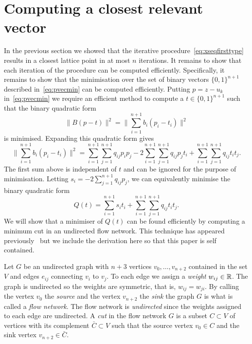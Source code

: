 \documentclass[final,leqno]{siamltex}
\begin{document}
\section{Computing a closest relevant vector}\label{sec:comp-clos-relev}

In the previous section we showed that the iterative procedure~\eqref{eq:xseqfirsttype} results in a closest lattice point in at most $n$ iterations.  It remains to show that each iteration of the procedure can be computed efficiently.  Specifically, it remains to show that the minimisation over the set of binary vectors $\{0,1\}^{n+1}$ described in~\eqref{eq:pvecmin} can be computed efficiently.  Putting $p = z - u_k$ in~\eqref{eq:pvecmin} we require an efficient method to compute a $t \in \{0,1\}^{n+1}$ such that the binary quadratic form
\[
\| B(p - t) \|^2 = \| \sum_{i=1}^{n+1} b_i (p_i - t_i) \|^2
\]
is minimised.  Expanding this quadratic form gives
\[
\| \sum_{i=1}^{n+1} b_i (p_i - t_i) \|^2 =  \sum_{i=1}^{n+1}\sum_{j=1}^{n+1} q_{ij}p_i p_j -  2\sum_{i=1}^{n+1}\sum_{j=1}^{n+1} q_{ij}p_j t_i + \sum_{i=1}^{n+1}\sum_{j=1}^{n+1} q_{ij} t_i t_j.
\]
The first sum above is independent of $t$ and can be ignored for the purpose of minimisation.  Letting $s_i = -2\sum_{j=1}^{n+1} q_{ij}p_j$, we can equivalently minimise the binary quadratic form
\begin{equation}\label{eq:quadformnp}
Q(t) = \sum_{i=1}^{n+1} s_i t_i + \sum_{i=1}^{n+1}\sum_{j=1}^{n+1} q_{ij} t_i t_j.
\end{equation}
We will show that a minimiser of $Q(t)$ can be found efficiently by computing a minimum cut in an undirected flow network.
This technique has appeared previously~\cite{Picard_min_cuts_1974,Sankaran_solving_CDMA_mincut_1998,Ulukus_cdma_mincut_1998,Cormen2001} but we include the derivation here so that this paper is self contained.

Let $G$ be an undirected graph with $n+3$ vertices $v_0, \dots, v_{n+2}$ contained in the set $V$ and edges $e_{ij}$ connecting $v_i$ to $v_j$.  To each edge we assign a \emph{weight} $w_{ij} \in {\mathbb R}$.  The graph is undirected so the weights are symmetric, that is, $w_{ij} = w_{ji}$.  By calling the vertex $v_0$ the \emph{source} and the vertex $v_{n+2}$ the \emph{sink} the graph $G$ is what is called a \emph{flow network}.  The flow network is \emph{undirected} since the weights assigned to each edge are undirected.  A \emph{cut} in the flow network $G$ is a subset $C \subset V$ of vertices with its complement $\bar{C} \subset V$ such that the source vertex $v_0 \in C$ and the sink vertex $v_{n+2} \in \bar{C}$.  %
\end{document}
